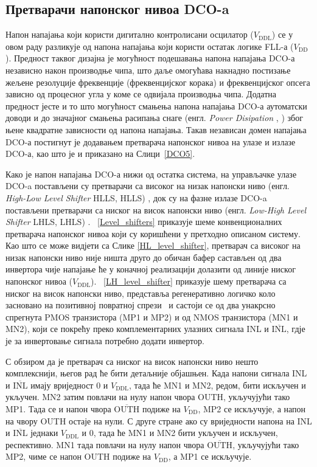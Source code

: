 \documentclass[master]{finthesis}
\makeatletter
\newcommand*{\engl}[2][\@empty]{%
    \edef\theacronym{#1}%
    (енгл. \foreignlanguage{english}{\emph{#2}%
    \ifx\theacronym\@empty \else , #1\fi})%
}
\def \FLL  {FLL} %
\def \DCO  {DCO} %
\makeatother
\begin{document}
\subsection{Претварачи напонског нивоа \DCO-a} \label{LS chapter}
Напон напајања који користи дигитално контролисани осцилатор ($V_\text{DDL}$) се у овом раду разликује од напона напајања који користи остатак логике \FLL-а ($V_\text{DD}$). Предност таквог дизајна је могућност подешавања напона напајања \DCO-а независно након производње чипа, што даље омогућава накнадно постизање жељене резолуције фреквенције (фреквенцијског корака) и фреквенцијског опсега зависно од процесног угла у коме се одвијала производња чипа. Додатна предност јесте и то што могућност смањења напона напајања \DCO-а аутоматски доводи и до значајног смањења расипања снаге \engl{Power Disipation} због њене квадратне зависности од напона напајања.
Такав независан домен напајања \DCO-а постигнут је додавањем претварача напонског нивоа на улазе и излазе \DCO-а, као што је и приказано на Слици~\ref{DCO5}. \par

Како је напон напајања \DCO-а нижи од остатка система, на управљачке улазе \DCO-a постављени су претварачи са високог на низак напонски ниво \engl[HLLS]{High-Low Level Shifter}, док су на фазне излазе \DCO-a постављени претварачи са ниског на висок напонски ниво \engl[LHLS]{Low-High Level Shifter}. \figurename~\ref{Level_shifters} приказује шеме конвенционалних претварача напонског нивоа који су коришћени у претходно описаном систему. Као што се може видјети са Слике \ref{HL_level_shifter}, претварач са високог на низак напонски ниво није ништа друго до обичан бафер састављен од два инвертора чије напајање ће у коначној реализацији долазити од линије ниског напонског нивоа ($V_\text{DDL}$). \figurename~\ref{LH_level_shifter} приказује шему претварача са ниског на висок напонски ниво, представља регенеративно логичко коло засновано на позитивној повратној спрези~\cite{Osaki:6198744} и састоји се од два унакрсно спрегнута PMOS транзистора (MP1 и MP2) и од NMOS транзистора (MN1 и MN2), који се покрећу преко комплементарних улазних сигнала INL и $\overline{\mbox{INL}}$, гдје је за инвертовање сигнала потребно додати инвертор. \par
С обзиром да је претварач са ниског на висок напонски ниво нешто комплекснији, његов рад ће бити детаљније објашњен. Када напони сигнала INL и $\overline{\mbox{INL}}$ имају вриједност 0 и $V_\text{DDL}$, тада ће MN1 и MN2, редом, бити искључен и укључен. MN2 затим повлачи на нулу напон чвора OUTH, укључујући тако MP1. Тада се и напон чвора $\overline{\mbox{OUTH}}$ подиже на $V_\text{DD}$, MP2 се искључује, а напон на чвору OUTH остаје на нули. С друге стране ако су вриједности напона на INL и $\overline{\mbox{INL}}$ једнаки $V_\text{DDL}$ и 0, тада ће MN1 и MN2 бити укључен и искључен, респективно. MN1 тада повлачи на нулу напон чвора $\overline{\mbox{OUTH}}$, укључујући тако MP2, чиме се напон OUTH подиже на $V_\text{DD}$, а MP1 се искључује. \par
\end{document}
